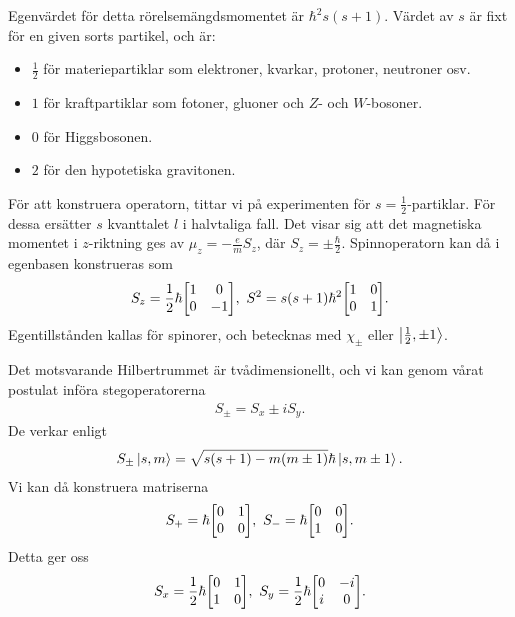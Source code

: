 Egenvärdet för detta rörelsemängdsmomentet är $\hbar^{2}s(s + 1)$. Värdet av $s$ är fixt för en given sorts partikel, och är:
\begin{itemize}
	\item $\frac{1}{2}$ för materiepartiklar som elektroner, kvarkar, protoner, neutroner osv.
	\item $1$ för kraftpartiklar som fotoner, gluoner och $Z$- och $W$-bosoner.
	\item $0$ för Higgsbosonen.
	\item $2$ för den hypotetiska gravitonen.
\end{itemize}

För att konstruera operatorn, tittar vi på experimenten för $s = \frac{1}{2}$-partiklar. För dessa ersätter $s$ kvanttalet $l$ i halvtaliga fall. Det visar sig att det magnetiska momentet i $z$-riktning ges av $\mu_{z} = -\frac{e}{m}S_{z}$, där $S_{z} = \pm\frac{\hbar}{2}$. Spinnoperatorn kan då i egenbasen konstrueras som
\begin{align*}
	S_{z} = \frac{1}{2}\hbar
	\mqty[
		1 & 0 \\
		0 & -1
	],\
	S^{2} = s(s + 1)\hbar^{2}
	\mqty[
		1 & 0 \\
		0 & 1
	].
\end{align*}
Egentillstånden kallas för spinorer, och betecknas med $\chi_{\pm}$ eller $\ket{\frac{1}{2}, \pm 1}$.

Det motsvarande Hilbertrummet är tvådimensionellt, och vi kan genom vårat postulat införa stegoperatorerna
\begin{align*}
	S_{\pm} = S_{x} \pm iS_{y}.
\end{align*}
De verkar enligt
\begin{align*}
	S_{\pm}\ket{s, m} = \sqrt{s(s + 1) - m(m \pm 1)}\hbar\ket{s, m \pm 1}.
\end{align*}
Vi kan då konstruera matriserna
\begin{align*}
	S_{+} = \hbar
	\mqty[
		0 & 1 \\
		0 & 0
	],\
	S_{-} = \hbar
	\mqty[
		0 & 0 \\
		1 & 0
	].
\end{align*}
Detta ger oss
\begin{align*}
	S_{x} = \frac{1}{2}\hbar
	\mqty[
		0 & 1 \\
		1 & 0
	],\ 
	S_{y} = \frac{1}{2}\hbar
	\mqty[
		0 & -i \\
		i & 0
	].
\end{align*}

